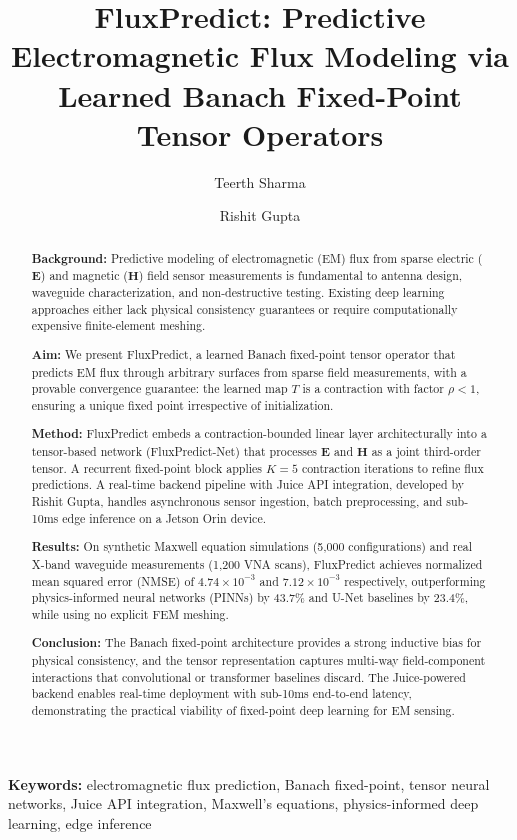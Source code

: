 \documentclass[12pt]{article}
\title{FluxPredict: Predictive Electromagnetic Flux Modeling via Learned Banach Fixed-Point Tensor Operators}
\author[1]{Teerth Sharma}
\author[2]{Rishit Gupta}
\affil[1]{Independent Researcher, India}
\affil[2]{Independent Researcher, India}
\begin{document}
\begin{abstract}
\textbf{Background:} Predictive modeling of electromagnetic (EM) flux from sparse electric ($\mathbf{E}$) and magnetic ($\mathbf{H}$) field sensor measurements is fundamental to antenna design, waveguide characterization, and non-destructive testing. Existing deep learning approaches either lack physical consistency guarantees or require computationally expensive finite-element meshing.

\textbf{Aim:} We present FluxPredict, a learned Banach fixed-point tensor operator that predicts EM flux through arbitrary surfaces from sparse field measurements, with a provable convergence guarantee: the learned map $T$ is a contraction with factor $\rho < 1$, ensuring a unique fixed point irrespective of initialization.

\textbf{Method:} FluxPredict embeds a contraction-bounded linear layer architecturally into a tensor-based network (FluxPredict-Net) that processes $\mathbf{E}$ and $\mathbf{H}$ as a joint third-order tensor. A recurrent fixed-point block applies $K=5$ contraction iterations to refine flux predictions. A real-time backend pipeline with Juice API integration, developed by Rishit Gupta, handles asynchronous sensor ingestion, batch preprocessing, and sub-10ms edge inference on a Jetson Orin device.

\textbf{Results:} On synthetic Maxwell equation simulations (5,000 configurations) and real X-band waveguide measurements (1,200 VNA scans), FluxPredict achieves normalized mean squared error (NMSE) of $4.74 \times 10^{-3}$ and $7.12 \times 10^{-3}$ respectively, outperforming physics-informed neural networks (PINNs) by 43.7\% and U-Net baselines by 23.4\%, while using no explicit FEM meshing.

\textbf{Conclusion:} The Banach fixed-point architecture provides a strong inductive bias for physical consistency, and the tensor representation captures multi-way field-component interactions that convolutional or transformer baselines discard. The Juice-powered backend enables real-time deployment with sub-10ms end-to-end latency, demonstrating the practical viability of fixed-point deep learning for EM sensing.
\end{abstract}

\textbf{Keywords:} electromagnetic flux prediction, Banach fixed-point, tensor neural networks, Juice API integration, Maxwell's equations, physics-informed deep learning, edge inference
\end{document}
